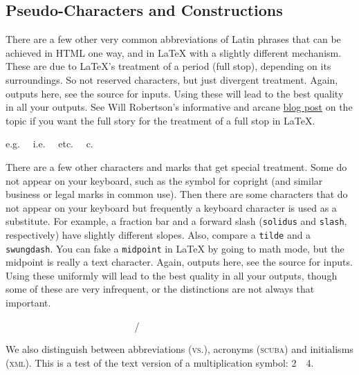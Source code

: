 \documentclass[10pt,]{article}
\newcommand{\abbreviation}[1]{\textsc{\MakeLowercase{#1}}}
\newcommand{\acronym}[1]{\textsc{\MakeLowercase{#1}}}
\newcommand{\initialism}[1]{\textsc{\MakeLowercase{#1}}}
\newcommand{\swungdash}{\raisebox{-2.25ex}{\scalebox{2}{\~{}}}}
\theoremstyle{plain}
\theoremstyle{definition}
\theoremstyle{definition}
\theoremstyle{definition}
\theoremstyle{definition}
\theoremstyle{definition}
\theoremstyle{definition}
\numberwithin{equation}{section}
\begin{document}
\subsection[{Pseudo-Characters and Constructions}]{Pseudo-Characters and Constructions}\label{subsection-13}
\hypertarget{p-213}{}%
There are a few other very common abbreviations of Latin phrases that can be achieved in HTML one way, and in \LaTeX{} with a slightly different mechanism.  These are due to \LaTeX{}'s treatment of a period (full stop), depending on its surroundings.  So not reserved characters, but just divergent treatment.  Again, outputs here, see the source for inputs.  Using these will lead to the best quality in all your outputs.  See Will Robertson's informative and arcane \href{http://latex-alive.tumblr.com/post/827168808/correct-punctuation-spaces}{blog post} on the topic if you want the full story for the treatment of a full stop in \LaTeX{}.%
\par
\hypertarget{p-214}{}%
e.g.\@~~ i.e.\@~~ etc.\@~~ c.\@%
\par
\hypertarget{p-215}{}%
There are a few other characters and marks that get special treatment.  Some do not appear on your keyboard, such as the symbol for copright (and similar business or legal marks in common use).  Then there are some characters that do not appear on your keyboard but frequently a keyboard character is used as a substitute.  For example, a fraction bar and a forward slash (\lstinline?solidus? and \lstinline?slash?, respectively) have slightly different slopes.  Also, compare a \lstinline?tilde? and a \lstinline?swungdash?.  You can fake a \lstinline?midpoint? in \LaTeX{} by going to math mode, but the midpoint is really a text character. Again, outputs here, see the source for inputs.  Using these uniformly will lead to the best quality in all your outputs, though some of these are very infrequent, or the distinctions are not always that important.%
\par
\hypertarget{p-216}{}%
\textcopyright{}~~ \textregistered{}~~ \texttrademark{}~~ \textellipsis{}~~ \textperiodcentered{}~~ \swungdash{}~~ \textperthousand{}~~ \textpilcrow{}~~ \textsection{}~~ \texttimes{}~~ \slash{}~~ \textfractionsolidus{}%
\par
\hypertarget{p-217}{}%
We also distinguish between abbreviations (\abbreviation{vs.}), acronyms (\acronym{SCUBA}) and initialisms (\initialism{XML}).  This is a test of the text version of a multiplication symbol: 2~\texttimes{}~4.%
\typeout{************************************************}
\typeout{************************************************}
\end{document}
